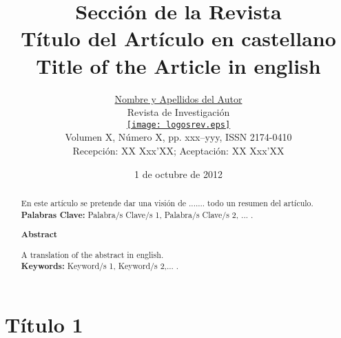 \documentclass[a4paper,10pt,twoside]{article}
\begin{document}
\renewcommand{\tablename}{Tabla} 

\title{\vspace{-8mm}Sección de la Revista\\\vspace{4mm}
Título del Artículo en castellano\\\vspace{4mm}
Title of the Article in english\vspace{-3mm}}  %
\author{\href{mailto:mailautor@xxxx.es}{Nombre y Apellidos del Autor}\\ \vspace{2mm} %
\scriptsize Revista de Investigación\\
\small \href{http://www2.caminos.upm.es/Departamentos/matematicas/revistapm/}{\texttt{[image: logosrev.eps]}}\\
\scriptsize Volumen X, Número X, pp. xxx--yyy, ISSN 2174-0410\vspace{-2mm}\\ 
\scriptsize Recepción: XX Xxx'XX; Aceptación: XX Xxx'XX} %
\date{1 de octubre de 2012}
\maketitle

\begin{abstract}
En este artículo se pretende dar una visión de ....... todo un resumen del artículo.\\
\newline
\noindent\textbf{Palabras Clave:} Palabra/s Clave/s 1, Palabra/s Clave/s 2, ... .
\newline
\begin{center}
 \textbf{Abstract}
\end{center}

\vspace{1.2mm}A translation of the abstract in english.\\
\newline
\noindent\textbf{Keywords:} Keyword/s 1, Keyword/s 2,... .

\end{abstract}

\section{Título 1}
\end{document}
